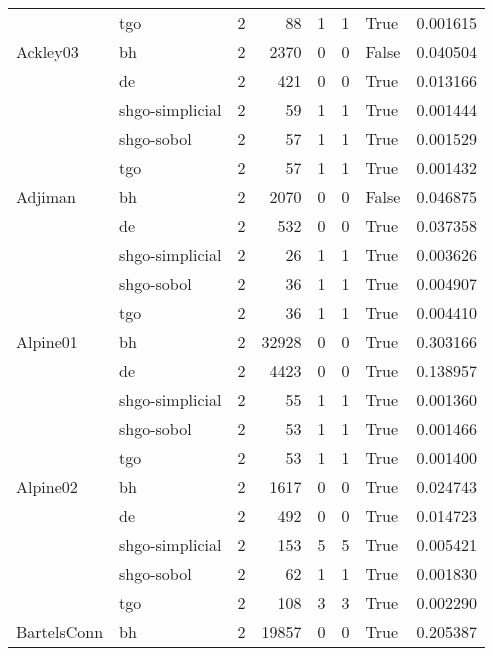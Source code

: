 \begin{longtable}{llrrrrlr}
         & tgo &     2 &       88 &      1 &       1 &    True &    0.001615 \\
Ackley03 & bh &     2 &     2370 &      0 &       0 &   False &    0.040504 \\
         & de &     2 &      421 &      0 &       0 &    True &    0.013166 \\
         & shgo-simplicial &     2 &       59 &      1 &       1 &    True &    0.001444 \\
         & shgo-sobol &     2 &       57 &      1 &       1 &    True &    0.001529 \\
         & tgo &     2 &       57 &      1 &       1 &    True &    0.001432 \\
Adjiman & bh &     2 &     2070 &      0 &       0 &   False &    0.046875 \\
         & de &     2 &      532 &      0 &       0 &    True &    0.037358 \\
         & shgo-simplicial &     2 &       26 &      1 &       1 &    True &    0.003626 \\
         & shgo-sobol &     2 &       36 &      1 &       1 &    True &    0.004907 \\
         & tgo &     2 &       36 &      1 &       1 &    True &    0.004410 \\
Alpine01 & bh &     2 &    32928 &      0 &       0 &    True &    0.303166 \\
         & de &     2 &     4423 &      0 &       0 &    True &    0.138957 \\
         & shgo-simplicial &     2 &       55 &      1 &       1 &    True &    0.001360 \\
         & shgo-sobol &     2 &       53 &      1 &       1 &    True &    0.001466 \\
         & tgo &     2 &       53 &      1 &       1 &    True &    0.001400 \\
Alpine02 & bh &     2 &     1617 &      0 &       0 &    True &    0.024743 \\
         & de &     2 &      492 &      0 &       0 &    True &    0.014723 \\
         & shgo-simplicial &     2 &      153 &      5 &       5 &    True &    0.005421 \\
         & shgo-sobol &     2 &       62 &      1 &       1 &    True &    0.001830 \\
         & tgo &     2 &      108 &      3 &       3 &    True &    0.002290 \\
BartelsConn & bh &     2 &    19857 &      0 &       0 &    True &    0.205387 \\

\end{longtable}
